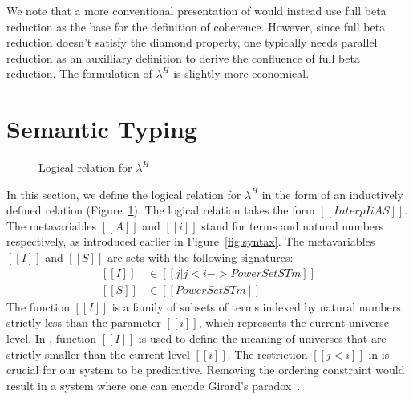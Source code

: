 \documentclass[nonacm]{acmart}
\newcommand{\lang}{$\lambda^H$\xspace}
\begin{document}
We note that a more conventional presentation of
 would instead use full beta reduction as the base for
the definition of coherence. However, since full beta reduction
doesn't satisfy the diamond property, one typically needs parallel
reduction as an auxilliary definition to derive the confluence of full
beta reduction. The formulation of \lang is slightly more economical.

\section{Semantic Typing}
\label{sec:logreldep}
\begin{figure}[h]
\caption{Logical relation for \lang}
\label{fig:logrel}
\end{figure}
In this section, we define the logical relation for \lang{} in the
form of an inductively defined relation (Figure~\ref{fig:logrel}). The
logical relation takes the form $[[Interp I i A S]]$. The
metavariables $[[A]]$ and $[[i]]$ stand for terms and natural
numbers respectively, as introduced earlier in
Figure~\ref{fig:syntax}.
The metavariables $[[I]]$ and $[[S]]$ are
sets with the following signatures:
\begin{equation*}
  \begin{split}
    [[I]] &\in [[ { j | j < i  } ->  PowerSet STm ]] \\
    [[S]] &\in [[PowerSet STm]]
  \end{split}
\end{equation*}
The function $[[I]]$ is a family of subsets of terms indexed by
natural numbers strictly less than the parameter $[[i]]$, which
represents the current universe level.  In , function
$[[I]]$ is used to define the meaning of
universes that are strictly smaller than the current level $[[i]]$. The
restriction $[[j < i]]$ in  is crucial for our system to
be predicative. Removing the ordering constraint would result in a
system where one can encode Girard's paradox~\citep{girard-thesis}.
\end{document}
